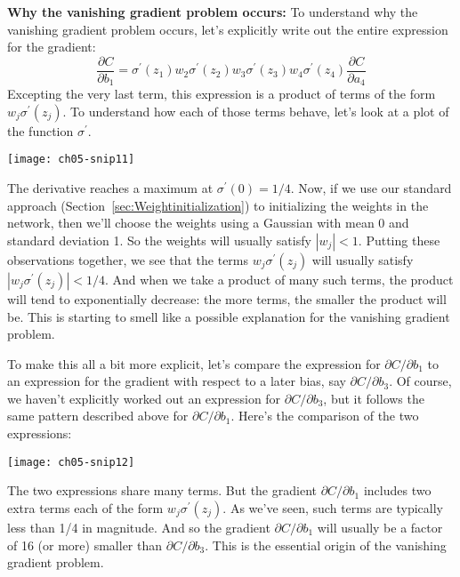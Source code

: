 \textbf{Why the vanishing gradient problem occurs: }\label{page:Whythevanishinggradientproblemoccurs}
To understand why the vanishing gradient problem occurs, let's explicitly write out the entire expression for the gradient: 
\begin{equation}
    \frac{\partial C}{\partial b_{1}}=\sigma^{\prime}\left(z_{1}\right) w_{2} \sigma^{\prime}\left(z_{2}\right) w_{3} \sigma^{\prime}\left(z_{3}\right) w_{4} \sigma^{\prime}\left(z_{4}\right) \frac{\partial C}{\partial a_{4}}
    \label{eq:c05-122}
    \end{equation}
Excepting the very last term, this expression is a product of terms of the form $w_{j} \sigma^{\prime}\left(z_{j}\right)$. To understand how each of those terms behave, let's look at a plot of the function $\sigma^\prime$. 

\begin{marginfigure}
    \texttt{[image: ch05-snip11]}
    \end{marginfigure}

The derivative reaches a maximum at $\sigma^{\prime}(0)=1 / 4$. Now, if we use our standard approach (Section~\ref{sec:Weightinitialization}) to initializing the weights in the network, then we'll choose the weights using a Gaussian with mean 0 and standard deviation 1. So the weights will usually satisfy $|w_j|<1$. Putting these observations together, we see that the terms $w_{j} \sigma^{\prime}\left(z_{j}\right)$ will usually satisfy $\left|w_{j} \sigma^{\prime}\left(z_{j}\right)\right|<1 / 4$. And when we take a product of many such terms, the product will tend to exponentially decrease: the more terms, the smaller the product will be. This is starting to smell like a possible explanation for the vanishing gradient problem.

To make this all a bit more explicit, let's compare the expression for $\partial C / \partial b_{1}$
to an expression for the gradient with respect to a later bias, say  $\partial C / \partial b_{3}$. Of course, we haven't explicitly worked out an expression for $\partial C / \partial b_{3}$, but it follows the same pattern described above for $\partial C / \partial b_{1}$. Here's the comparison of the two expressions: 
\begin{figure*}[tph]
    \texttt{[image: ch05-snip12]}
    \label{fig:ch05-snip12}
    \end{figure*}
The two expressions share many terms. But the gradient $\partial C / \partial b_{1}$ includes two extra terms each of the form $w_{j} \sigma^{\prime}\left(z_{j}\right)$. As we've seen, such terms are typically less than 1/4 in magnitude. And so the gradient $\partial C / \partial b_{1}$ will usually be a factor of 16 (or more) smaller than $\partial C / \partial b_{3}$. This is the essential origin of the vanishing gradient problem.

